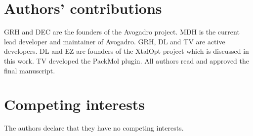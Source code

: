 \documentclass[10pt]{bmc_article}
\newenvironment{bmcformat}{\begin{raggedright}
\baselineskip20pt\sloppy\setboolean{publ}{false}}{\end{raggedright}
\baselineskip20pt\sloppy}
\begin{document}
\begin{bmcformat}
\section{Authors' contributions}
GRH and DEC are the founders of the Avogadro project. MDH is the
current lead developer and maintainer of Avogadro. GRH, DL and TV are
active developers. DL and EZ are founders of the XtalOpt project which
is discussed in this work. TV developed the PackMol plugin. All
authors read and approved the final manuscript.

\section{Competing interests}

The authors declare that they have no competing interests.


\newpage
{
   }     %



\end{bmcformat}
\end{document}
